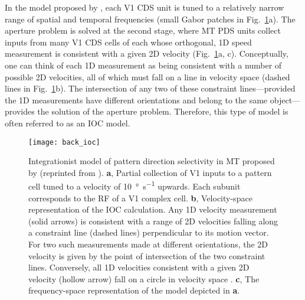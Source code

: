 In the model proposed by \cite{SimoncelliHeeger1998}, each \ac{V1} \ac{CDS} unit 
is tuned to a relatively narrow range of spatial and temporal frequencies
(small Gabor patches in Fig.~\ref{fig:BKG|SH}a).
The aperture problem is solved at the second stage, where \ac{MT} \ac{PDS}
units collect inputs from many \ac{V1} \ac{CDS} cells of each whose
orthogonal, 1D speed measurement is consistent with a given 2D velocity
(Fig.~\ref{fig:BKG|SH}a, c).
Conceptually, one can think of each 1D measurement as being consistent with 
a number of possible 2D velocities, all of which must fall on a line 
in velocity space (dashed lines in Fig.~\ref{fig:BKG|SH}b).
The intersection of any two of these constraint lines---provided the
1D measurements have different orientations and belong to the same 
object---provides the solution of the aperture problem.
Therefore, this type of model is often referred to as an \acf{IOC} model.

\begin{figure}[t]
  \centering
  \texttt{[image: back\_ioc]}
  \caption{
  Integrationist model of pattern direction selectivity in \ac{MT} proposed by
  \cite{SimoncelliHeeger1998}
  (reprinted from \cite{PackBorn2008}).
  \textbf{a}, Partial collection of \acf{V1} inputs
  to a pattern cell tuned to a velocity of \SI{10}{\degree\per\second} upwards.
  Each subunit corresponds to the \acf{RF} of a \ac{V1} complex cell.
  \textbf{b}, Velocity-space representation of the \acf{IOC} calculation.
  Any 1D velocity measurement (solid arrows) is consistent with a range of 2D
  velocities falling along a constraint line (dashed lines) perpendicular to its
  motion vector. For two such measurements made at different orientations, the 2D
  velocity is given by the point of intersection of the two constraint lines.
  Conversely, all 1D velocities consistent with a given 2D velocity (hollow arrow) 
  fall on a circle in velocity space \citep{PackBorn2008}.
  \textbf{c}, The frequency-space representation of the model depicted in \textbf{a}.}
  \label{fig:BKG|SH}
\end{figure}


